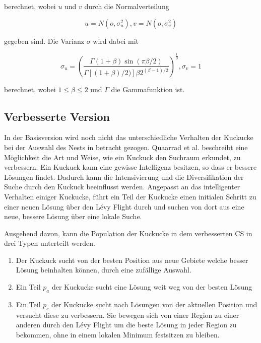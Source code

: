 \documentclass[conference]{IEEEtran}
\begin{document}
      berechnet, wobei $u$ und $v$ durch die Normalverteilung

      \begin{equation}
        u = N(o,\sigma_{u}^{2}), v = N(o,\sigma_{v}^{2})\label{eq}
      \end{equation}

        gegeben sind. Die Varianz $\sigma$ wird dabei mit

      \begin{equation}
        \sigma_{u} = \left(\frac{\Gamma(1 + \beta)\sin(\pi\beta/2)}{\Gamma[(1 + \beta)/2)]\beta2^{(\beta-1)/2}}\right)^{\frac{1}{\beta}} , \sigma_{v} = 1 \label{eq}
      \end{equation}

      berechnet, wobei $1 \leq \beta \leq 2$ und $\Gamma$ die Gammafunktion ist. 

    \subsection{Verbesserte Version}
      In der Basisversion wird noch nicht das unterschiedliche Verhalten der Kuckucke bei der Auswahl 
      des Nests in betracht gezogen. Quaarrad et al. \cite{b9} beschreibt eine Möglichkeit die Art und 
      Weise, wie ein Kuckuck den Suchraum erkundet, zu verbessern. Ein Kuckuck kann eine gewisse Intelligenz 
      besitzen, so dass er bessere Lösungen findet. Dadurch kann die Intensivierung und die Diversifikation der 
      Suche durch den Kuckuck beeinflusst werden. Angepasst an das intelligenter Verhalten einiger Kuckucke, 
      führt ein Teil der Kuckucke einen initialen Schritt zu einer neuen Lösung über 
      den Lévy Flight durch und suchen von dort aus eine neue, bessere Lösung über eine lokale Suche.

      Ausgehend davon, kann die Population der Kuckucke in dem verbesserten CS in drei Typen unterteilt werden.

      \begin{enumerate}
        \item Der Kuckuck sucht von der besten Position aus neue Gebiete welche besser Lösung beinhalten können, durch eine zufällige Auswahl.
        \item Ein Teil $p_{a}$ der Kuckucke sucht eine Lösung weit weg von der besten Lösung
        \item Ein Teil $p_{c}$ der Kuckucke sucht nach Lösungen von der aktuellen Position und versucht diese zu 
          verbessern. Sie bewegen sich von einer Region zu einer anderen durch den Lévy Flight um die beste Lösung 
          in jeder Region zu bekommen, ohne in einem lokalen Minimum festsitzen zu bleiben.
      \end{enumerate}
\end{document}
